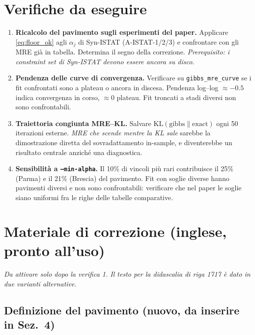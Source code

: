 \documentclass[11pt,a4paper]{article}
\begin{document}
\section{Verifiche da eseguire}

\begin{enumerate}[leftmargin=*]
\item \textbf{Ricalcolo del pavimento sugli esperimenti del paper.}
  Applicare \eqref{eq:floor_ok} agli $\alpha_j$ di Syn-ISTAT
  (A-ISTAT-1/2/3) e confrontare con gli MRE già in tabella. Determina
  il segno della correzione. \emph{Prerequisito: i constraint set di
  Syn-ISTAT devono essere ancora su disco.}
\item \textbf{Pendenza delle curve di convergenza.} Verificare su
  \texttt{gibbs\_mre\_curve} se i fit confrontati sono a plateau o
  ancora in discesa. Pendenza log--log $\approx-0.5$ indica
  convergenza in corso, $\approx0$ plateau. Fit troncati a stadi
  diversi non sono confrontabili.
\item \textbf{Traiettoria congiunta MRE--KL.} Salvare
  $\mathrm{KL}(\text{gibbs}\|\text{exact})$ ogni 50 iterazioni
  esterne. \emph{MRE che scende mentre la KL sale} sarebbe la
  dimostrazione diretta del sovradattamento in-sample, e diventerebbe
  un risultato centrale anziché una diagnostica.
\item \textbf{Sensibilità a \texttt{--min-alpha}.} Il 10\% di vincoli
  più rari contribuisce il 25\% (Parma) e il 21\% (Brescia) del
  pavimento. Fit con soglie diverse hanno pavimenti diversi e non sono
  confrontabili: verificare che nel paper le soglie siano uniformi
  fra le righe delle tabelle comparative.
\end{enumerate}

\section{Materiale di correzione (inglese, pronto all'uso)}

\noindent
\emph{Da attivare solo dopo la verifica 1. Il testo per la didascalia
di riga 1717 è dato in due varianti alternative.}

\subsection*{Definizione del pavimento (nuovo, da inserire in Sez.~4)}
\end{document}
